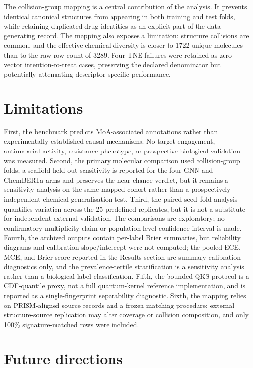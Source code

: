 \documentclass[11pt,a4paper]{article}
\begin{document}
The collision-group mapping is a central contribution of the analysis. It prevents identical canonical structures from appearing in both training and test folds, while retaining duplicated drug identities as an explicit part of the data-generating record. The mapping also exposes a limitation: structure collisions are common, and the effective chemical diversity is closer to \num{1722} unique molecules than to the raw row count of \num{3289}. Four TNE failures were retained as zero-vector intention-to-treat cases, preserving the declared denominator but potentially attenuating descriptor-specific performance.

\section{Limitations}

First, the benchmark predicts MoA-associated annotations rather than experimentally established causal mechanisms. No target engagement, antimalarial activity, resistance phenotype, or prospective biological validation was measured. Second, the primary molecular comparison used collision-group folds; a scaffold-held-out sensitivity is reported for the four GNN and ChemBERTa arms and preserves the near-chance verdict, but it remains a sensitivity analysis on the same mapped cohort rather than a prospectively independent chemical-generalisation test. Third, the paired seed--fold analysis quantifies variation across the 25 predefined replicates, but it is not a substitute for independent external validation. The comparisons are exploratory; no confirmatory multiplicity claim or population-level confidence interval is made. Fourth, the archived outputs contain per-label Brier summaries, but reliability diagrams and calibration slope/intercept were not computed; the pooled ECE, MCE, and Brier score reported in the Results section are summary calibration diagnostics only, and the prevalence-tertile stratification is a sensitivity analysis rather than a biological label classification. Fifth, the bounded QKS protocol is a CDF-quantile proxy, not a full quantum-kernel reference implementation, and is reported as a single-fingerprint separability diagnostic. Sixth, the mapping relies on PRISM-aligned source records and a frozen matching procedure; external structure-source replication may alter coverage or collision composition, and only \num{100}{\%} signature-matched rows were included.

\section{Future directions}
\end{document}
